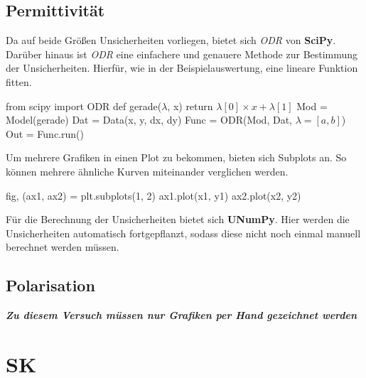 \documentclass[a4paper,12pt]{article}
\begin{document}
\subsection{Permittivität}
Da auf beide Größen Unsicherheiten vorliegen, bietet sich \textit{ODR} von \textbf{SciPy}. Darüber hinaus ist \textit{ODR} eine einfachere und genauere Methode zur Bestimmung der Unsicherheiten. Hierfür, wie in der Beispielauswertung, eine lineare Funktion fitten.
\begin{center}
\begin{tcolorbox}[colback=gray!20, colframe=black, width=1\textwidth, boxrule=1pt, arc=1mm]
from scipy import ODR \newline
def gerade($\lambda$, x) \newline
\hspace*{1cm} return $\lambda[0] \times x + \lambda[1]$ \newline
Mod = Model(gerade) \newline
Dat = Data(x, y, dx, dy) \newline
Func = ODR(Mod, Dat, $\lambda=[a, b]$) \newline
Out = Func.run()
\end{tcolorbox}
\end{center}
Um mehrere Grafiken in einen Plot zu bekommen, bieten sich Subplots an. So können mehrere ähnliche Kurven miteinander verglichen werden.
\begin{center}
\begin{tcolorbox}[colback=gray!20, colframe=black, width=1\textwidth, boxrule=1pt, arc=1mm]
fig, (ax1, ax2) = plt.subplots(1, 2) \newline
ax1.plot(x1, y1) \newline
ax2.plot(x2, y2)
\end{tcolorbox}
\end{center}
Für die Berechnung der Unsicherheiten bietet sich \textbf{UNumPy}. Hier werden die Unsicherheiten automatisch fortgepflanzt, sodass diese nicht noch einmal manuell berechnet werden müssen.

\subsection{Polarisation}
\textbf{\textit{Zu diesem Versuch müssen nur Grafiken per Hand gezeichnet werden}}



\section{SK}
\end{document}
